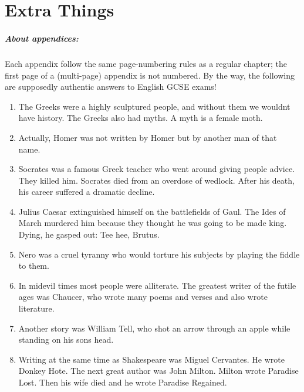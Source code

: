 \chapter{Extra Things}	%

\paragraph{About appendices:}
	Each appendix follow the same page-numbering rules
	as a regular chapter; the first page of a
	(multi-page) appendix is not numbered.
	By the way, the following are supposedly
	authentic answers to English GCSE exams!


\begin{enumerate}

\item
The Greeks were a highly sculptured people, and without
them we wouldnt have history. The Greeks also had myths.
A myth is a female moth.

\item
Actually, Homer was not written by Homer but by another
man of that name.

\item
Socrates was a famous Greek teacher who went around
giving people advice. They killed him. Socrates died from an
overdose of wedlock. After his death, his career suffered a
dramatic decline.

\item
Julius Caesar extinguished himself on the battlefields
of Gaul. The Ides of March murdered him because they thought
he was going to be made king. Dying, he gasped out: Tee hee,
Brutus.

\item
Nero was a cruel tyranny who would torture his subjects
by playing the fiddle to them.

\item
In midevil times most people were alliterate. The
greatest writer of the futile ages was Chaucer, who
wrote many poems and verses and also wrote literature.

\item
Another story was William Tell, who shot an arrow
through an apple while standing on his sons head.

\item
Writing at the same time as Shakespeare was Miguel
Cervantes. He wrote Donkey Hote. The next great author
was John Milton. Milton wrote Paradise Lost. Then his
wife died and he wrote Paradise Regained.


\end{enumerate}
